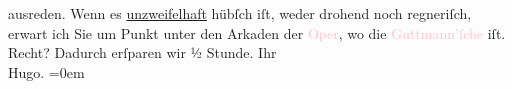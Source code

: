                ausreden.\pend
           \pstart
           Wenn es \uline{unzweifelhaft} hübſch iſt, weder drohend noch
               regneriſch, erwart ich Sie um Punkt \label{K_L00339_2v}\label{K_L00339_2h} unter
               den Arkaden der \textcolor{pink}{Oper}{}\ledrightnote{\textcolor{pink}{Oper}}, wo die \textcolor{pink}{Guttmann’ſche \label{K_L00339_3v}\label{K_L00339_3h}}{}\ledrightnote{\textcolor{pink}{Musikalienhandlung Albert J. Gutmann}} iſt. Recht? Dadurch erſparen wir ½ Stunde.\pend
           \pstart
           Ihr{\\[\baselineskip]}\spacefill\mbox{Hugo.}\pend
           \leftskip=0em{}\endnumbering{}  
      